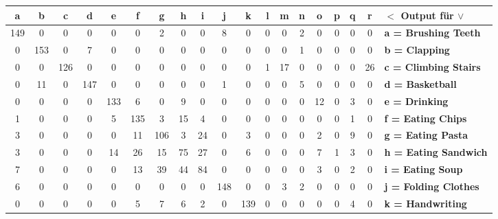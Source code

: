 \begin{table}
\centering
\begin{tabular}{|c|c|c|c|c|c|c|c|c|c|c|c|c|c|c|c|c|c||l|}
\hline 
\textbf{a} &  \textbf{b} & \textbf{c} & \textbf{d} & \textbf{e} & \textbf{f} & \textbf{g} & \textbf{h} & \textbf{i} & \textbf{j} & \textbf{k} & \textbf{l} & \textbf{m} & \textbf{n} & \textbf{o} & \textbf{p} & \textbf{q} & \textbf{r} & \textbf{$<$ Output für $\vee$} \\
\hline 
\hline 
149 & 0 & 0 & 0 & 0 & 0 & 2 & 0 & 0 & 8 & 0 & 0 & 0 & 2 & 0 & 0 & 0 & 0 & \textbf{a = Brushing Teeth} \\
\hline 
0 & 153 & 0 & 7 & 0 & 0 & 0 & 0 & 0 & 0 & 0 & 0 & 0 & 1 & 0 & 0 & 0 & 0 & \textbf{b = Clapping} \\
\hline 
0 & 0 & 126 & 0 & 0 & 0 & 0 & 0 & 0 & 0 & 0 & 1 &17 & 0 & 0 & 0 & 0 & 26 & \textbf{c = Climbing Stairs} \\
\hline 
0 & 11 & 0 & 147 & 0 & 0 & 0 & 0 & 0 & 1 & 0 & 0 & 0 & 5 & 0 & 0 & 0 & 0 & \textbf{d = Basketball} \\
\hline 
0 & 0 & 0 & 0 & \cellcolor{lightgray} 133 & \cellcolor{lightgray} 6 & \cellcolor{lightgray} 0 & \cellcolor{lightgray} 9 & \cellcolor{lightgray}  0 & 0 & 0 & 0 & 0 & 0 & 12 & 0 & 3 & 0 & \textbf{e = Drinking} \\
\hline 
1 & 0 & 0 & 0 & \cellcolor{lightgray} 5 & \cellcolor{lightgray} 135 & \cellcolor{lightgray} 3 & \cellcolor{lightgray} 15 & \cellcolor{lightgray} 4 & 0 & 0 & 0 & 0 & 0 & 0 & 0 & 1 & 0 & \textbf{f = Eating Chips} \\
\hline 
3 & 0 & 0 & 0 & \cellcolor{lightgray} 0 & \cellcolor{lightgray} \cellcolor{lightgray} 11 & \cellcolor{lightgray} 106 & \cellcolor{lightgray} 3 & \cellcolor{lightgray} 24 & 0 & 3 & 0 & 0 & 0 & 2 & 0 & 9 & 0 & \textbf{g = Eating Pasta} \\
\hline 
3 & 0 & 0 & 0 & \cellcolor{lightgray} 14 & \cellcolor{lightgray} 26 & \cellcolor{lightgray} 15 & \cellcolor{lightgray} 75 & \cellcolor{lightgray} 27 & 0 & 6 & 0 & 0 & 0 & 7 & 1 & 3 & 0 & \textbf{h = Eating Sandwich} \\
\hline 
7 & 0 & 0 & 0 & \cellcolor{lightgray} 0 & \cellcolor{lightgray} 13 & \cellcolor{lightgray} 39 & \cellcolor{lightgray} 44 & \cellcolor{lightgray} 84 & 0 & 0 & 0 & 0 & 0 & 3 & 0 & 2 & 0 & \textbf{i = Eating Soup} \\
\hline 
6 & 0 & 0 & 0 & 0 & 0 & 0 & 0 & 0 & 148 & 0 & 0 & 3 & 2 & 0 & 0 & 0 & 0 & \textbf{j = Folding Clothes} \\
\hline 
0 & 0 & 0 & 0 & 0 & 5 & 7 & 6 & 2 & 0 & 139 & 0 & 0 & 0 & 0 & 0 & 4 & 0 & \textbf{k = Handwriting} \\

\end{tabular}
\end{table}
